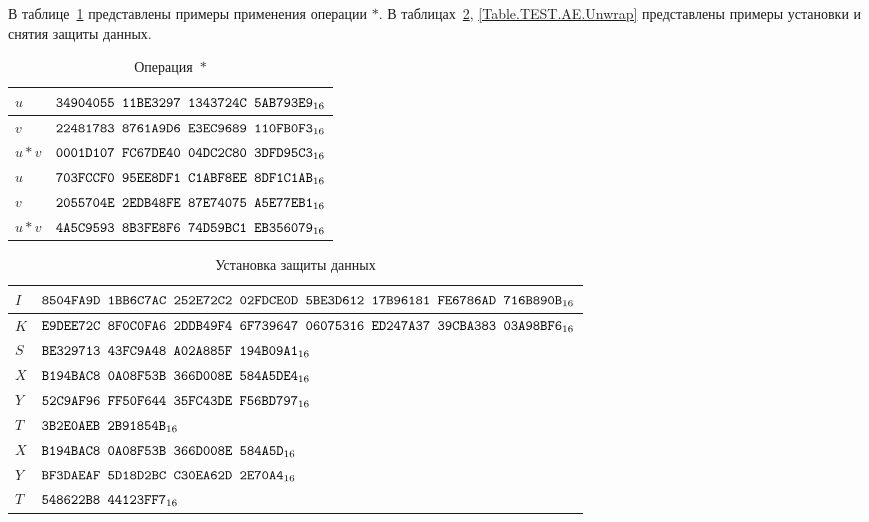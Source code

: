 \label{TEST.AE}

В таблице~\ref{Table.TEST.AE.Ast} представлены примеры применения операции $\ast$.
%
В таблицах~\ref{Table.TEST.AE.Wrap}, \ref{Table.TEST.AE.Unwrap}
представлены примеры установки и снятия защиты данных.

\begin{table}[H]
\caption{Операция~$\ast$}\label{Table.TEST.AE.Ast}
\begin{tabular}{|l|l|}
\hline
$u$ &
$\texttt{34904055~11BE3297~1343724C~5AB793E9}_{16}$\\
\hline
$v$ &
$\texttt{22481783~8761A9D6~E3EC9689~110FB0F3}_{16}$\\
\dhline
$u\ast v$ & 
$\texttt{0001D107~FC67DE40~04DC2C80~3DFD95C3}_{16}$\\
\ddhline
$u$ &
$\texttt{703FCCF0~95EE8DF1~C1ABF8EE~8DF1C1AB}_{16}$\\
\hline
$v$ &
$\texttt{2055704E~2EDB48FE~87E74075~A5E77EB1}_{16}$\\
\dhline
$u\ast v$ & 
$\texttt{4A5C9593~8B3FE8F6~74D59BC1~EB356079}_{16}$\\
\hline
\end{tabular}
\end{table}

\begin{table}[H]
\caption{Установка защиты данных}\label{Table.TEST.AE.Wrap}
\begin{tabular}{|l|l|}
\hline
$I$ &
$\texttt{8504FA9D~1BB6C7AC~252E72C2~02FDCE0D~5BE3D612~17B96181~FE6786AD~716B890B}_{16}$\\
\hline
$K$ & 
$\texttt{E9DEE72C~8F0C0FA6~2DDB49F4~6F739647~06075316~ED247A37~39CBA383~03A98BF6}_{16}$\\
\hline
$S$ & 
$\texttt{BE329713~43FC9A48~A02A885F~194B09A1}_{16}$\\
\ddhline
$X$ &
$\texttt{B194BAC8~0A08F53B~366D008E~584A5DE4}_{16}$\\
\dhline
$Y$ &
$\texttt{52C9AF96~FF50F644~35FC43DE~F56BD797}_{16}$\\
\hline
$T$ &
$\texttt{3B2E0AEB~2B91854B}_{16}$\\
\ddhline
$X$ &
$\texttt{B194BAC8~0A08F53B~366D008E~584A5D}_{16}$\\
\dhline
$Y$ &
$\texttt{BF3DAEAF~5D18D2BC~C30EA62D~2E70A4}_{16}$\\
\hline
$T$ &
$\texttt{548622B8~44123FF7}_{16}$\\
\hline
\end{tabular}
\end{table}

